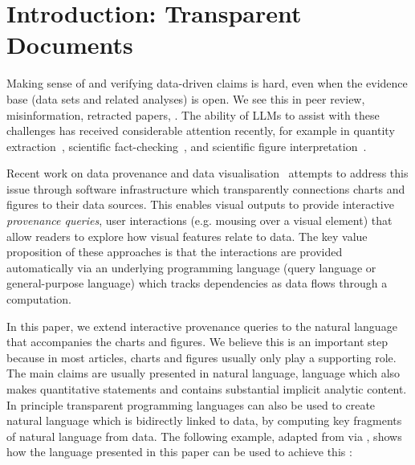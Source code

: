 \section{Introduction: Transparent Documents}

Making sense of and verifying data-driven claims is hard, even when the evidence base (data sets and related
analyses) is open. We see this in peer review, misinformation, retracted papers, . The ability of LLMs to assist with these challenges has received considerable attention recently,
for example in quantity extraction~\citep{bolucu23}, scientific fact-checking~\citep{abu-ahmad25}, and
scientific figure interpretation~\citep{roberts24}.

Recent work on data provenance and data visualisation~\citep{psallidas18smoke,perera22,bond25} attempts to
address this issue through software infrastructure which transparently connections charts and figures to their
data sources.  This enables visual outputs
to provide interactive \emph{provenance queries}, user interactions (e.g. mousing over a visual element) that
allow readers to explore how visual features relate to data. The key value proposition of these approaches is
that the interactions are provided automatically via an underlying programming language (query language or
general-purpose language) which tracks dependencies as data flows through a computation.

In this paper, we extend interactive provenance queries to the natural language that accompanies the charts
and figures. We believe this is an important step because in most articles, charts and figures usually only
play a supporting role. The main claims are usually presented in natural language, language which also makes
quantitative statements and contains substantial implicit analytic content. In principle transparent
programming languages can also be used to create natural language which is bidirectly linked to data, by
computing key fragments of natural language from data. The following example, adapted from \cite{zhang18} via
\cite{moosavi21}, shows how the language presented in this paper can be used to achieve this :

